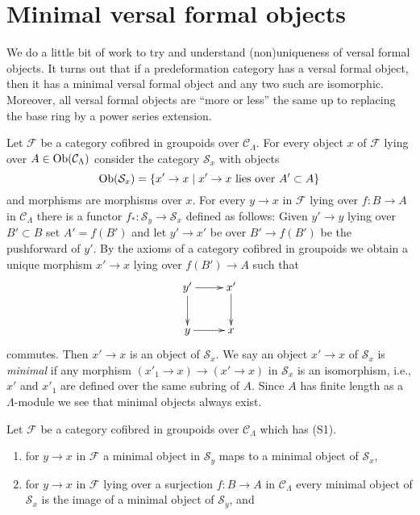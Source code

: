 




\section{Minimal versal formal objects}
\label{section-minimal-versal}

\noindent
We do a little bit of work to try and understand (non)uniqueness
of versal formal objects. It turns out that if a predeformation category
has a versal formal object, then it has a minimal versal formal
object and any two such are isomorphic. Moreover, all versal formal
objects are ``more or less'' the same up to replacing the base ring
by a power series extension.

\medskip\noindent
Let $\mathcal{F}$ be a category cofibred in groupoids over
$\mathcal{C}_\Lambda$. For every object $x$ of $\mathcal{F}$
lying over $A \in \mathop{\rm Ob}\nolimits(\mathcal{C}_\Lambda)$ consider the
category $\mathcal{S}_x$ with objects
$$
\mathop{\rm Ob}\nolimits(\mathcal{S}_x) =
\{x' \to x \mid x' \to x\text{ lies over }A' \subset A\}
$$
and morphisms are morphisms over $x$. For every $y \to x$ in
$\mathcal{F}$ lying over $f : B \to A$
in $\mathcal{C}_\Lambda$ there is a functor
$f_* : \mathcal{S}_y \to \mathcal{S}_x$ defined as follows:
Given $y' \to y$ lying over $B' \subset B$ set $A' = f(B')$
and let $y' \to x'$ be over $B' \to f(B')$ be the pushforward of $y'$.
By the axioms of a category cofibred in groupoids we obtain a
unique morphism $x' \to x$ lying over $f(B') \to A$ such that
$$
\xymatrix{
y' \ar[d] \ar[r] & x' \ar[d] \\
y \ar[r] & x
}
$$
commutes. Then $x' \to x$ is an object of $\mathcal{S}_x$. We say an
object $x' \to x$ of $\mathcal{S}_x$ is {\it minimal} if any morphism
$(x'_1 \to x) \to (x' \to x)$ in $\mathcal{S}_x$ is an isomorphism, i.e.,
$x'$ and $x'_1$ are defined over the same subring of $A$. Since
$A$ has finite length as a $\Lambda$-module we see that minimal objects
always exist.

\begin{lemma}
\label{lemma-smallest-where-descends}
Let $\mathcal{F}$ be a category cofibred in groupoids over
$\mathcal{C}_\Lambda$ which has (S1).
\begin{enumerate}
\item for $y \to x$ in $\mathcal{F}$ a minimal
object in $\mathcal{S}_y$ maps to a minimal object of $\mathcal{S}_x$,
\item for $y \to x$ in $\mathcal{F}$ lying over a surjection
$f : B \to A$ in $\mathcal{C}_\Lambda$ every minimal object
of $\mathcal{S}_x$ is the image of a minimal object of
$\mathcal{S}_y$, and
\end{enumerate}
\end{lemma}

